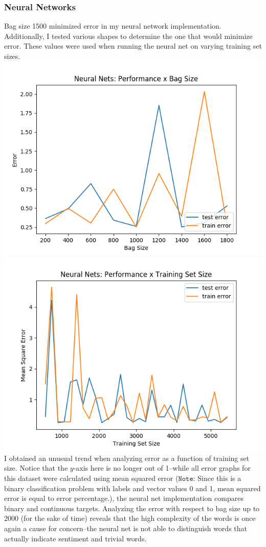 \documentclass[11pt, a4paper]{article} %
\begin{document}
\subsubsection{Neural Networks}
Bag size 1500 minimized error in my neural network implementation.  Additionally, I tested various shapes to determine the one that would minimize error. These values were used when running the neural net on varying training set sizes.
\newline\newline
\includegraphics[scale=0.525]{Bag_Size.png}
\includegraphics[scale=0.525]{NN_TSS2.png}
I obtained an unusual trend when analyzing error as a function of training set size. Notice that the $y$-axis here is no longer out of 1--while all error graphs for this dataset were calculated using mean squared error ($\texttt{Note:}$ Since this is a binary classification problem with labels and vector values 0 and 1, mean squared error is equal to error percentage.), the neural net implementation compares binary and continuous targets. Analyzing the error with respect to bag size up to 2000 (for the sake of time) reveals that the high complexity of the words is once again a cause for concern--the neural net is not able to distinguish words that actually indicate sentiment and trivial words.
\end{document}
